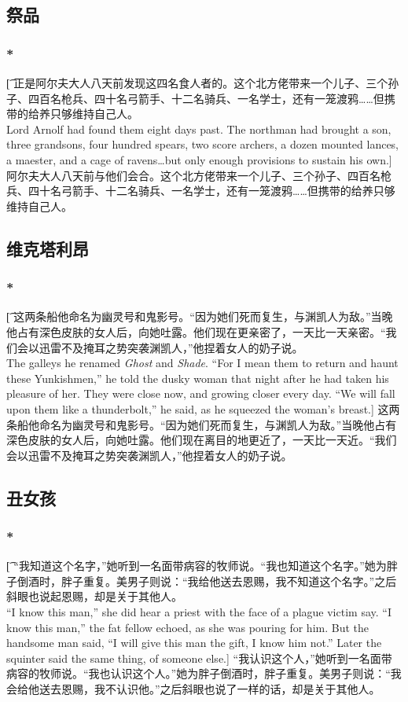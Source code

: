 \documentclass[12pt,a4paper]{article}
\begin{document}
\subsection{祭品}
\subsubsection{\color{red}*}\t[
	正是阿尔夫大人八天前发现这四名食人者的。这个北方佬带来一个儿子、三个孙子、四百名枪兵、四十名弓箭手、十二名骑兵、一名学士，还有一笼渡鸦……但携带的给养只够维持自己人。\\
	Lord Arnolf had found them eight days past. The northman had brought a son, three grandsons, four hundred spears, two score archers, a dozen mounted lances, a maester, and a cage of ravens\ldots but only enough provisions to sustain his own.]
	阿尔夫大人八天前与他们会合。这个北方佬带来一个儿子、三个孙子、四百名枪兵、四十名弓箭手、十二名骑兵、一名学士，还有一笼渡鸦……但携带的给养只够维持自己人。
	
\subsection{维克塔利昂}
\subsubsection{\color{red}*}\t[
	这两条船他命名为幽灵号和鬼影号。“因为她们死而复生，与渊凯人为敌。”当晚他占有深色皮肤的女人后，向她吐露。他们现在更亲密了，一天比一天亲密。“我们会以迅雷不及掩耳之势突袭渊凯人，”他捏着女人的奶子说。\\
	The galleys he renamed \emph{Ghost} and \emph{Shade}. “For I mean them to return and haunt these Yunkishmen,” he told the dusky woman that night after he had taken his pleasure of her. They were close now, and growing closer every day. “We will fall upon them like a thunderbolt,” he said, as he squeezed the woman's breast.]
	这两条船他命名为幽灵号和鬼影号。“因为她们死而复生，与渊凯人为敌。”当晚他占有深色皮肤的女人后，向她吐露。他们现在离目的地更近了，一天比一天近。“我们会以迅雷不及掩耳之势突袭渊凯人，”他捏着女人的奶子说。
	
\subsection{丑女孩}
\subsubsection{\color{red}*}\t[
	“我知道这个名字，”她听到一名面带病容的牧师说。“我也知道这个名字。”她为胖子倒酒时，胖子重复。美男子则说：“我给他送去恩赐，我不知道这个名字。”之后斜眼也说起恩赐，却是关于其他人。\\
	“I know this man,” she did hear a priest with the face of a plague victim say. “I know this man,” the fat fellow echoed, as she was pouring for him. But the handsome man said, “I will give this man the gift, I know him not.” Later the squinter said the same thing, of someone else.]
	“我认识这个人，”她听到一名面带病容的牧师说。“我也认识这个人。”她为胖子倒酒时，胖子重复。美男子则说：“我会给他送去恩赐，我不认识他。”之后斜眼也说了一样的话，却是关于其他人。
\end{document}

